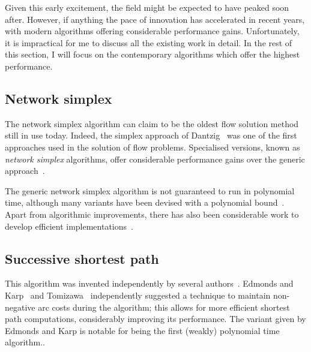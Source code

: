Given this early excitement, the field might be expected to have peaked soon after. However, if anything the pace of innovation has accelerated in recent years, with modern algorithms offering considerable performance gains. Unfortunately, it is impractical for me to discuss all the existing work in detail. In the rest of this section, I will focus on the contemporary algorithms which offer the highest performance.

\subsection{Network simplex}

The network simplex algorithm can claim to be the oldest flow solution method still in use today. Indeed, the simplex approach of Dantzig~\cite{Dantzig:1949} was one of the first approaches used in the solution of flow problems. Specialised versions, known as \emph{network simplex} algorithms, offer considerable performance gains over the generic approach~\cite{Dantzig:1962}.

The generic network simplex algorithm is not guaranteed to run in polynomial time\footnotemark, although many variants have been devised with a polynomial bound~\cite{Tarjan:1991,Goldfarb:1992}. Apart from algorithmic improvements, there has also been considerable work to develop efficient implementations~\cite{Lobel:1996,Grigoriadis:1986}.

\subsection{Successive shortest path} \label{sec:intro-related-work-ssp}

This algorithm was invented independently by several authors~\cite{Jewell:1958,Iri:1960,BusackerGowen:1960}. Edmonds and Karp~\cite{Edmonds:1972} and Tomizawa~\cite{Tomizawa:1971} independently suggested a technique to maintain non-negative arc costs during the algorithm; this allows for more efficient shortest path computations, considerably improving its performance. The variant given by Edmonds and Karp is notable for being the first (weakly) polynomial time algorithm.\footnotemark.

